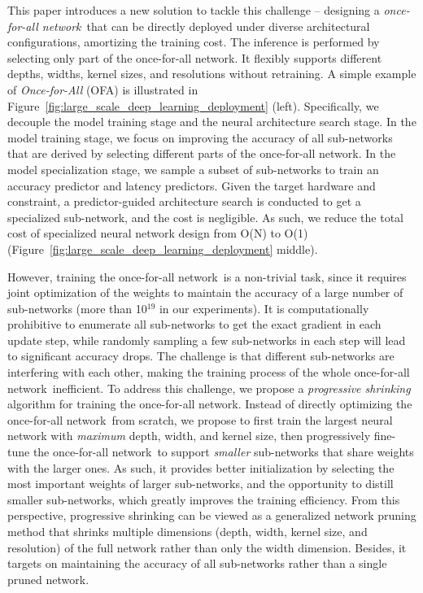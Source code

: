 \documentclass{article} \usepackage{iclr2020_conference,times}
\newcommand{\motherNet}{once-for-all network}
\begin{document}
This paper introduces a new solution to tackle this challenge -- designing a \textit{\motherNet}~that can be directly deployed under diverse architectural configurations, amortizing the training cost. The inference is performed by selecting only part of the \motherNet. It flexibly supports different depths, widths, kernel sizes, and resolutions without retraining.
A simple example of \emph{Once-for-All} (OFA) is illustrated in Figure~\ref{fig:large_scale_deep_learning_deployment} (left). Specifically, we decouple the model training stage and the neural architecture search stage. In the model training stage, we focus on improving the accuracy of all sub-networks that are derived by selecting different parts of the \motherNet. 
In the model specialization stage, we sample a subset of sub-networks to train an accuracy predictor and latency predictors. Given the target hardware and constraint, a predictor-guided architecture search \citep{liu2018progressive} is conducted to get a specialized sub-network, and the cost is negligible.  As such, we reduce the total cost of specialized neural network design from O(N) to O(1) (Figure~\ref{fig:large_scale_deep_learning_deployment} middle). 

However, training the \motherNet~is a non-trivial task, since it requires joint optimization of the weights to maintain the accuracy of a large number of sub-networks (more than 10$^{19}$ in our experiments). It is computationally prohibitive to enumerate all sub-networks to get the exact gradient in each update step, while randomly sampling a few sub-networks in each step will lead to significant accuracy drops. The challenge is that different sub-networks are interfering with each other, making the training process of the whole \motherNet~inefficient. 
To address this challenge, we propose a \textit{progressive shrinking} algorithm for training the \motherNet. Instead of directly optimizing the \motherNet~from scratch, we propose to first train the largest neural network with \emph{maximum} depth, width, and kernel size, then progressively fine-tune the \motherNet~to support \textit{smaller} sub-networks that share weights with the larger ones. As such, it provides better initialization by selecting the most important weights of larger sub-networks, and the opportunity to distill smaller sub-networks, which greatly improves the training efficiency. From this perspective, progressive shrinking can be viewed as a generalized network pruning method that shrinks multiple dimensions (depth, width, kernel size, and resolution) of the full network rather than only the width dimension. Besides, it targets on maintaining the accuracy of all sub-networks rather than a single pruned network. 
\end{document}
